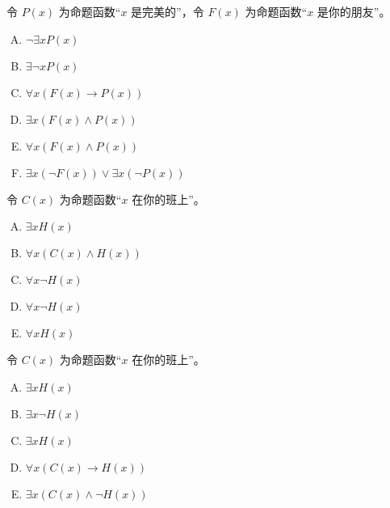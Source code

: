 {{        %
        \begin{practices}
            令 $P(x)$ 为命题函数``$x$ 是完美的''，令 $F(x)$ 为命题函数``$x$ 是你的朋友''。
            \begin{enumerate}[A.]
                \item $\neg \exists x P(x)$
                \item $\exists \neg x P(x)$
                \item $\forall x (F(x) \rightarrow P(x))$
                \item $\exists x (F(x) \wedge P(x))$
                \item $\forall x (F(x) \wedge P(x))$
                \item $\exists x (\neg F(x)) \vee \exists x (\neg P(x))$
            \end{enumerate}
        \end{practices}

        \begin{practices}
            令 $C(x)$ 为命题函数``$x$ 在你的班上''。
            \begin{enumerate}[A.]
                \item $\exists x H(x)$
                \item $\forall x (C(x) \wedge H(x))$
                \item $\forall x \neg H(x)$
                \item $\forall x \neg H(x)$
                \item $\forall x H(x)$
            \end{enumerate}
        \end{practices}

        \begin{practices}
            令 $C(x)$ 为命题函数``$x$ 在你的班上''。
            \begin{enumerate}[A.]
                \item $\exists x H(x)$
                \item $\exists x \neg H(x)$
                \item $\exists x H(x)$
                \item $\forall x (C(x) \rightarrow H(x))$
                \item $\exists x (C(x) \wedge \neg H(x))$
            \end{enumerate}
        \end{practices}

}}
